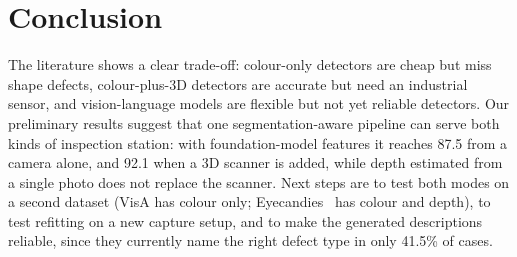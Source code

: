 \documentclass[conference]{IEEEtran}
\begin{document}
\section{Conclusion}
The literature shows a clear trade-off: colour-only detectors are cheap but miss shape defects, colour-plus-3D detectors are accurate but need an industrial sensor, and vision-language models are flexible but not yet reliable detectors. Our preliminary results suggest that one segmentation-aware pipeline can serve both kinds of inspection station: with foundation-model features it reaches 87.5 from a camera alone, and 92.1 when a 3D scanner is added, while depth estimated from a single photo does not replace the scanner. Next steps are to test both modes on a second dataset (VisA has colour only; Eyecandies~\cite{eyecandies} has colour and depth), to test refitting on a new capture setup, and to make the generated descriptions reliable, since they currently name the right defect type in only 41.5\% of cases.
\end{document}
